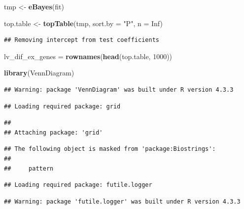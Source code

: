 \documentclass[
]{article}
\newenvironment{Shaded}{\begin{snugshade}}{\end{snugshade}}
\newcommand{\AttributeTok}[1]{\textcolor[rgb]{0.13,0.29,0.53}{#1}}
\newcommand{\ConstantTok}[1]{\textcolor[rgb]{0.56,0.35,0.01}{#1}}
\newcommand{\DecValTok}[1]{\textcolor[rgb]{0.00,0.00,0.81}{#1}}
\newcommand{\FunctionTok}[1]{\textcolor[rgb]{0.13,0.29,0.53}{\textbf{#1}}}
\newcommand{\NormalTok}[1]{#1}
\newcommand{\OtherTok}[1]{\textcolor[rgb]{0.56,0.35,0.01}{#1}}
\newcommand{\StringTok}[1]{\textcolor[rgb]{0.31,0.60,0.02}{#1}}
\begin{document}
\begin{Shaded}
\begin{Highlighting}[]
\NormalTok{tmp }\OtherTok{\textless{}{-}} \FunctionTok{eBayes}\NormalTok{(fit)}

\NormalTok{top.table }\OtherTok{\textless{}{-}} \FunctionTok{topTable}\NormalTok{(tmp, }\AttributeTok{sort.by =} \StringTok{"P"}\NormalTok{, }\AttributeTok{n =} \ConstantTok{Inf}\NormalTok{)}
\end{Highlighting}
\end{Shaded}

\begin{verbatim}
## Removing intercept from test coefficients
\end{verbatim}

\begin{Shaded}
\begin{Highlighting}[]
\NormalTok{lv\_dif\_ex\_genes }\OtherTok{=} \FunctionTok{rownames}\NormalTok{(}\FunctionTok{head}\NormalTok{(top.table, }\DecValTok{1000}\NormalTok{))}
\end{Highlighting}
\end{Shaded}

\begin{Shaded}
\begin{Highlighting}[]
\FunctionTok{library}\NormalTok{(VennDiagram)}
\end{Highlighting}
\end{Shaded}

\begin{verbatim}
## Warning: package 'VennDiagram' was built under R version 4.3.3
\end{verbatim}

\begin{verbatim}
## Loading required package: grid
\end{verbatim}

\begin{verbatim}
## 
## Attaching package: 'grid'
\end{verbatim}

\begin{verbatim}
## The following object is masked from 'package:Biostrings':
## 
##     pattern
\end{verbatim}

\begin{verbatim}
## Loading required package: futile.logger
\end{verbatim}

\begin{verbatim}
## Warning: package 'futile.logger' was built under R version 4.3.3
\end{verbatim}
\end{document}

